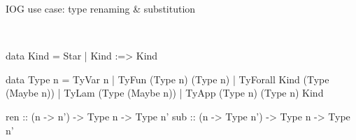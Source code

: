 \documentclass[aspectratio=169]{beamer}
\newcommand\resetVars{
  \def\sourceRatio{.5}
  \def\zoom{1}
  \def\hsFontsize{\normalsize}
  \def\midruleL{-1cm}
  \def\midruleR{.5cm}
  \def\sourceIcon{agda}
}
\def\hsSize{\fpeval{1 - \sourceRatio}}
\def\rightSize{\hsSize\textwidth}
\newcommand\midrule{\hspace{\midruleL}\vrule\hspace{\midruleR}}
\begin{document}
\begin{frame}[fragile]{IOG use case: type renaming \& substitution}
\begin{sourcepage}
\begin{code}
\AgdaSpace{}%
\AgdaSpace{}%
\AgdaSpace{}%
\AgdaSpace{}%
\<%
\end{code}
\begin{code}[hide]%
\>[0]\AgdaSymbol{\{-\#}\AgdaSpace{}%
\AgdaSpace{}%
\AgdaSpace{}%
\AgdaSpace{}%
\AgdaSymbol{\#-\}}\<%
\\
\>[0]\AgdaSymbol{\{-\#}\AgdaSpace{}%
\AgdaSpace{}%
\AgdaSpace{}%
\AgdaSpace{}%
\AgdaSymbol{\#-\}}\<%
\end{code}
\end{sourcepage}
\midrule
\begin{minipage}{\rightSize}
\begin{haskellcode}
data Kind
  = Star
  | Kind :=> Kind

data Type n
  = TyVar n
  | TyFun (Type n) (Type n)
  | TyForall Kind (Type (Maybe n))
  | TyLam (Type (Maybe n))
  | TyApp (Type n) (Type n) Kind

ren :: (n -> n') -> Type n -> Type n'
sub :: (n -> Type n') -> Type n -> Type n'
\end{haskellcode}
\end{minipage}
\resetVars
\end{frame}
\end{document}
